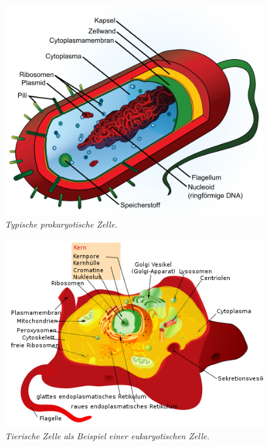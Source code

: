 	\begin{figure}[ht!]
	\leavevmode
	\begin{center}
	\includegraphics[scale=0.47]{./pictures/avg_prokaryote_cell_500}
	\end{center}
	\caption{\slshape{Typische prokaryotische Zelle.}}
	\label{fig:prokarya}
	\end{figure}

	\begin{figure}[ht!]
	\leavevmode
	\begin{center}
	\includegraphics[scale=0.47]{./pictures/animal_cell_500}
	\end{center}
	\caption{\slshape{Tierische Zelle als Beispiel einer eukaryotischen Zelle.}}
	\label{fig:eukarya}
	\end{figure}


